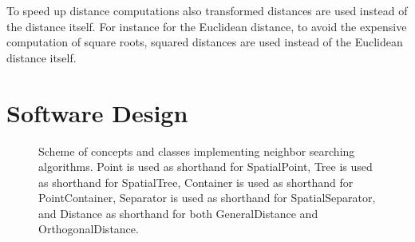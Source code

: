 To speed up distance computations also transformed distances are used
instead of the distance itself.  For instance for the Euclidean
distance, to avoid the expensive computation of square roots, squared
distances are used instead of the Euclidean distance itself.



\section{Software Design}

\begin{ccTexOnly}
\begin{figure}[t]
\begin{center}
\leavevmode
\vspace*{-6.5cm}
\hspace*{-2cm}
\end{center}
\vspace*{6cm}
\caption{Scheme of concepts and classes implementing neighbor searching algorithms.
Point is used as shorthand for SpatialPoint, Tree is used as shorthand for SpatialTree,
Container is used as shorthand for PointContainer,
Separator is used as shorthand for SpatialSeparator,
and Distance as shorthand for both GeneralDistance and OrthogonalDistance.
\label{ASPAS:Fig1}}
\end{figure}
\end{ccTexOnly}


